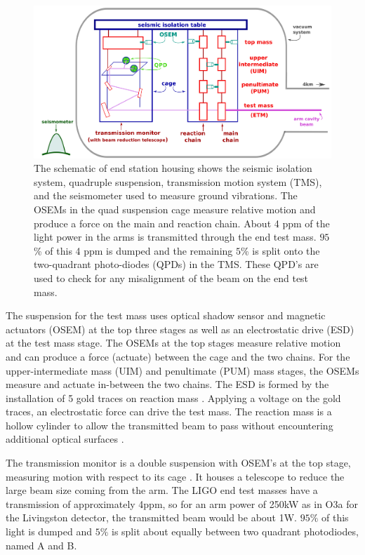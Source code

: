 \documentclass[12pt]{iopart}
\begin{document}
\begin{figure}
    \centering
    \includegraphics[width=\textwidth]{EndStationDiagram3.png}
    \caption{The schematic of end station housing shows the seismic isolation system, quadruple suspension, transmission motion system (TMS), and the seismometer used to measure ground vibrations. The OSEMs in the quad suspension cage measure relative motion and produce a force on the main and reaction chain. About 4 ppm of the light power in the arms is transmitted through the end test mass. $95$\% of this 4 ppm is dumped and the remaining $5$\% is split onto the two-quadrant photo-diodes (QPDs) in the TMS. These QPD's are used to check for any misalignment of the beam on the end test mass. }
    \label{fig:end_station}
\end{figure}
The suspension for the test mass uses optical shadow sensor and magnetic actuators (OSEM)  at the top three stages as well as an electrostatic drive (ESD) at the test mass stage. The OSEMs at the top stages measure relative motion and can produce a force (actuate) between the cage and the two chains. For the upper-intermediate mass (UIM) and penultimate (PUM) mass stages, the OSEMs measure and actuate in-between the two chains. The ESD is formed by the installation of 5 gold traces on reaction mass \cite{esd_schematic}. Applying a voltage on the gold traces, an electrostatic force can drive the test mass.  The reaction mass is a hollow cylinder to allow the transmitted beam to pass without encountering additional optical surfaces \cite{aerm_schematic}.

The transmission monitor is a double suspension with OSEM's at the top stage, measuring motion with respect to its cage \cite{Barsotti_2010}. It houses a telescope to reduce the large beam size coming from the arm. The LIGO end test masses have a transmission of approximately 4ppm, so for an arm power of 250kW as in O3a for the Livingston detector, the transmitted beam would be about 1W. $95\%$ of this light is dumped and $5\%$ is split about equally between two quadrant photodiodes, named A and B. 
\end{document}

